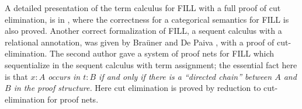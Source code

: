 
A detailed presentation of the term calculus for FILL with a full
proof of cut elimination, is in \cite{EadesP:2016}, where the
correctness for a categorical semantics for FILL is also proved.
Another correct formalization of FILL, a sequent calculus with a
relational annotation, was given by Bra\"uner and De Paiva
\cite{BraunerDePaiva:1997}, with a proof of cut-elimination.  The
second author \cite{Bellin:1997} gave a system of proof nets for FILL
which sequentialize in the sequent calculus with term assignment; the
essential fact here is that \emph{$x:A$ occurs in $t:B$ if and only if there
is a ``directed chain'' between $A$ and $B$ in the proof structure.} 
Here cut elimination is proved by reduction to cut-elimination for proof nets.


